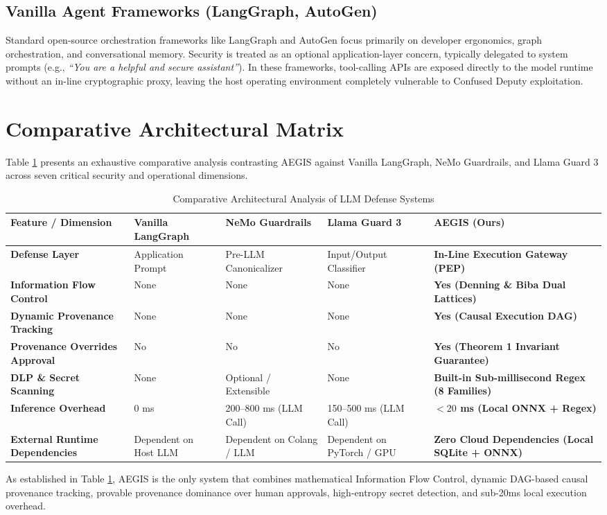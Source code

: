 \subsection{Vanilla Agent Frameworks (LangGraph, AutoGen)}
Standard open-source orchestration frameworks like LangGraph and AutoGen \cite{wu2023autogen} focus primarily on developer ergonomics, graph orchestration, and conversational memory. Security is treated as an optional application-layer concern, typically delegated to system prompts (e.g., \textit{``You are a helpful and secure assistant''}). In these frameworks, tool-calling APIs are exposed directly to the model runtime without an in-line cryptographic proxy, leaving the host operating environment completely vulnerable to Confused Deputy exploitation.

\section{Comparative Architectural Matrix}
Table \ref{tab:comparison} presents an exhaustive comparative analysis contrasting AEGIS against Vanilla LangGraph, NeMo Guardrails, and Llama Guard 3 across seven critical security and operational dimensions.

\begin{table}[htbp]
\centering
\small
\caption{Comparative Architectural Analysis of LLM Defense Systems}
\label{tab:comparison}
\begin{tabularx}{\textwidth}{lXXXX}
\toprule
\textbf{Feature / Dimension} & \textbf{Vanilla LangGraph} & \textbf{NeMo Guardrails} & \textbf{Llama Guard 3} & \textbf{AEGIS (Ours)} \\
\midrule
\textbf{Defense Layer} & Application Prompt & Pre-LLM Canonicalizer & Input/Output Classifier & \textbf{In-Line Execution Gateway (PEP)} \\
\addlinespace
\textbf{Information Flow Control} & None & None & None & \textbf{Yes (Denning \& Biba Dual Lattices)} \\
\addlinespace
\textbf{Dynamic Provenance Tracking} & None & None & None & \textbf{Yes (Causal Execution DAG)} \\
\addlinespace
\textbf{Provenance Overrides Approval} & No & No & No & \textbf{Yes (Theorem 1 Invariant Guarantee)} \\
\addlinespace
\textbf{DLP \& Secret Scanning} & None & Optional / Extensible & None & \textbf{Built-in Sub-millisecond Regex (8 Families)} \\
\addlinespace
\textbf{Inference Overhead} & 0 ms & 200--800 ms (LLM Call) & 150--500 ms (LLM Call) & \textbf{$< 20$ ms (Local ONNX + Regex)} \\
\addlinespace
\textbf{External Runtime Dependencies} & Dependent on Host LLM & Dependent on Colang / LLM & Dependent on PyTorch / GPU & \textbf{Zero Cloud Dependencies (Local SQLite + ONNX)} \\
\bottomrule
\end{tabularx}
\end{table}

As established in Table \ref{tab:comparison}, AEGIS is the only system that combines mathematical Information Flow Control, dynamic DAG-based causal provenance tracking, provable provenance dominance over human approvals, high-entropy secret detection, and sub-20ms local execution overhead.

